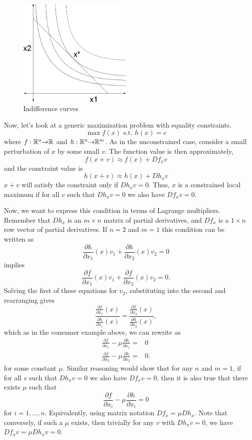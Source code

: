 \begin{figure}\caption{Indifference curves\label{fig:indiff}}
  \begin{center}
    \includegraphics[width=0.5\textwidth]{indiff}
  \end{center}
\end{figure}

Now, let's look at a generic maximization problem with equality
constraints. \[ \max f(x) \text{ s.t. } h(x) = c \]
where $f: \mathbb{R}^n {\rightarrow} \mathbb{R}$ and $h: \mathbb{R}^n {\rightarrow} \mathbb{R}^m$. As in the unconstrained
case, consider a small perturbation of $x$ by some small $v$. The
function value is then approximately,
\[ f(x+v) \approx f(x) + Df_x v \]
and the constraint value is 
\[ h(x+v) \approx h(x) + Dh_x v \] $x+v$ will satisfy the
constraint only if $Dh_xv = 0$. Thus, $x$ is a constrained local
maximum if for all $v$ such that $Dh_x v = 0$ we also have $Df_x v =
0$. 

Now, we want to express this condition in terms of Lagrange
multipliers. Remember that $Dh_x$ is an $m \times n$ matrix of partial
derivatives, and $Df_x$ is a $1 \times n$ row vector of partial
derivatives.  If $n=2$ and $m=1$ this condition can be written as
\[ \frac{\partial h}{\partial x_1} (x) v_1 + \frac{\partial
  h}{\partial x_2} (x) v_2 = 0 \]
implies
\[ \frac{\partial f}{\partial x_1} (x) v_1 + \frac{\partial
  f}{\partial x_2} (x) v_2 = 0. \]
Solving the first of these equations for $v_2$, substituting into the
second and rearranging gives
\[ \frac{ \frac{\partial f}{\partial x_1}(x) } { \frac{\partial
    h}{\partial x_1}(x) } = \frac{ \frac{\partial f}{\partial x_2}(x)}
{ \frac{\partial h}{\partial x_2}(x) }, \]
which as in the consumer example above, we can rewrite as
\begin{align*}
  \frac{\partial f}{\partial x_1} - \mu  \frac{\partial h}{\partial x_1} = & 0 \\
  \frac{\partial f}{\partial x_2} - \mu  \frac{\partial h}{\partial x_2} = & 0.
\end{align*}
for some constant $\mu$. Similar reasoning would show that for any $n$
and $m=1$, if for all $v$ such that $Dh_x v = 0$ we also have $Df_x v =
0$, then it is also true that there exists $\mu$ such that 
\[ \frac{\partial f}{\partial x_i} - \mu  \frac{\partial h}{\partial
  x_i} = 0 \] 
for  $i=1, ..., n$. Equivalently, using matrix notation $Df_x = \mu
Dh_x$. Note that conversely, if such a $\mu$ exists, then trivially
for any $v$ with $Dh_x v =0$, we have $Df_x v = \mu Dh_x v = 0$. 

